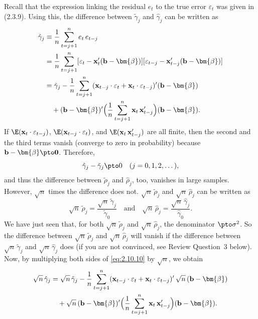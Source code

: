 Recall that the expression linking the residual $e_t$ to the true error $\varepsilon_t$ was
given in (2.3.9). Using this, the difference between $\tilde{\gamma}_j$ and $\hat{\gamma}_j$ can be written as
%
\begin{align}
\hat{\gamma}_j &\equiv \frac{1}{n}\sum_{t=j+1}^{n} e_t\,e_{t-j} \notag \\
&= \frac{1}{n}\sum_{t=j+1}^{n}
[\varepsilon_t - \mathbf{x}_t'(\mathbf{b} - \bm{\beta})]
[\varepsilon_{t-j} - \mathbf{x}_{t-j}'(\mathbf{b} - \bm{\beta})] \notag \\
&= \tilde{\gamma}_j
- \frac{1}{n}\sum_{t=j+1}^{n}
(\mathbf{x}_{t-j} \cdot \varepsilon_t + \mathbf{x}_t \cdot \varepsilon_{t-j})'(\mathbf{b} - \bm{\beta}) \notag \\
&\quad + (\mathbf{b} - \bm{\beta})'\Bigl(\frac{1}{n}\sum_{t=j+1}^{n}
\mathbf{x}_t\,\mathbf{x}_{t-j}'\Bigr)(\mathbf{b} - \bm{\beta}).
\label{eq:2.10.10}
\end{align}
%
If $\E(\mathbf{x}_t \cdot \varepsilon_{t-j})$, $\E(\mathbf{x}_{t-j} \cdot \varepsilon_t)$, and
$\E(\mathbf{x}_t\,\mathbf{x}_{t-j}')$ are all finite, then the second and the third
terms vanish (converge to zero in probability) because
$\mathbf{b} - \bm{\beta} \pto \mathbf{0}$. Therefore,
\[
\hat{\gamma}_j - \tilde{\gamma}_j \pto 0
\quad (j = 0, 1, 2, \ldots\,),
\]
and thus the difference between $\tilde{\rho}_j$ and $\hat{\rho}_j$, too, vanishes in large samples.
However, $\sqrt{n}$ times the difference does not.
$\sqrt{n}\,\tilde{\rho}_j$ and $\sqrt{n}\,\hat{\rho}_j$ can be written as
%
\begin{equation}
\sqrt{n}\,\tilde{\rho}_j = \frac{\sqrt{n}\,\tilde{\gamma}_j}{\tilde{\gamma}_0}
\quad \text{and} \quad
\sqrt{n}\,\hat{\rho}_j = \frac{\sqrt{n}\,\hat{\gamma}_j}{\hat{\gamma}_0}.
\label{eq:2.10.11}
\end{equation}
%
We have just seen that, for both $\sqrt{n}\,\tilde{\rho}_j$ and $\sqrt{n}\,\hat{\rho}_j$,
the denominator $\pto \sigma^2$. So the difference between $\sqrt{n}\,\tilde{\rho}_j$ and
$\sqrt{n}\,\hat{\rho}_j$ will vanish if the difference between $\sqrt{n}\,\tilde{\gamma}_j$
and $\sqrt{n}\,\hat{\gamma}_j$ does (if you are not convinced, see Review Question~3 below).
Now, by multiplying both sides of \eqref{eq:2.10.10} by $\sqrt{n}$, we obtain
%
\begin{align}
\sqrt{n}\,\hat{\gamma}_j &= \sqrt{n}\,\tilde{\gamma}_j
- \frac{1}{n}\sum_{t=j+1}^{n}
(\mathbf{x}_{t-j}\cdot\varepsilon_t + \mathbf{x}_t\cdot\varepsilon_{t-j})'\,
\sqrt{n}\,(\mathbf{b} - \bm{\beta}) \notag \\
&\quad + \sqrt{n}\,(\mathbf{b} - \bm{\beta})'\Bigl(\frac{1}{n}\sum_{t=j+1}^{n}
\mathbf{x}_t\,\mathbf{x}_{t-j}'\Bigr)(\mathbf{b} - \bm{\beta}).
\label{eq:2.10.12}
\end{align}
